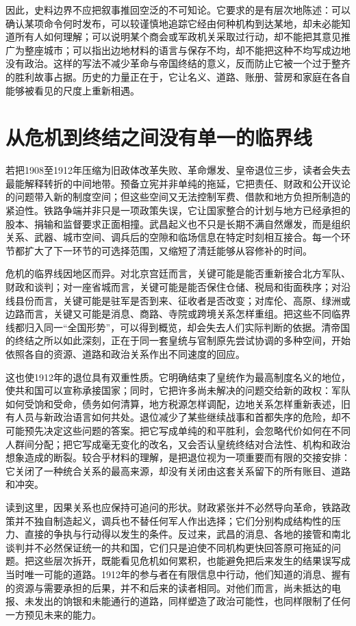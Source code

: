 因此，史料边界不应把叙事推回空泛的不可知论。它要求的是有层次地陈述：可以确认某项命令何时发布，可以较谨慎地追踪它经由何种机构到达某地，却未必能知道所有人如何理解；可以说明某个商会或军政机关采取过行动，却不能把其意见推广为整座城市；可以指出边地材料的语言与保存不均，却不能把这种不均写成边地没有政治。这样的写法不减少革命与帝国终结的意义，反而防止它被一个过于整齐的胜利故事占据。历史的力量正在于，它让名义、道路、账册、营房和家庭在各自能够被看见的尺度上重新相遇。

\section{从危机到终结之间没有单一的临界线}

若把1908至1912年压缩为旧政体改革失败、革命爆发、皇帝退位三步，读者会失去最能解释转折的中间地带。预备立宪并非单纯的拖延，它把责任、财政和公开议论的问题带入新的制度空间；但这些空间又无法控制军费、借款和地方负担所制造的紧迫性。铁路争端并非只是一项政策失误，它让国家整合的计划与地方已经承担的股本、捐输和监督要求正面相撞。武昌起义也不只是长期不满自然爆发，而是组织关系、武器、城市空间、调兵后的空隙和临场信息在特定时刻相互接合。每一个环节都扩大了下一环节的可选择范围，又缩短了清廷能够从容修补的时间。

危机的临界线因地区而异。对北京宫廷而言，关键可能是能否重新接合北方军队、财政和谈判；对一座省城而言，关键可能是能否保住仓储、税局和街面秩序；对沿线县份而言，关键可能是驻军是否到来、征收者是否改变；对库伦、高原、绿洲或边路而言，关键又可能是消息、商路、寺院或跨境关系怎样重组。把这些不同临界线都归入同一“全国形势”，可以得到概览，却会失去人们实际判断的依据。清帝国的终结之所以如此深刻，正在于同一套皇统与官制原先尝试协调的多种空间，开始依照各自的资源、道路和政治关系作出不同速度的回应。

这也使1912年的退位具有双重性质。它明确结束了皇统作为最高制度名义的地位，使共和国可以宣称承接国家；同时，它把许多尚未解决的问题交给新的政权：军队如何受饷和受命，债务如何清算，地方税源怎样调配，边地关系怎样重新表述，旧有人员与新政治语言如何共处。退位减少了某些继续战事和首都失序的危险，却不可能预先决定这些问题的答案。把它写成单纯的和平胜利，会忽略代价如何在不同人群间分配；把它写成毫无变化的改名，又会否认皇统终结对合法性、机构和政治想象造成的断裂。较合乎材料的理解，是把退位视为一项重要而有限的交接安排：它关闭了一种统合关系的最高来源，却没有关闭由这套关系留下的所有账目、道路和冲突。

读到这里，因果关系也应保持可追问的形状。财政紧张并不必然导向革命，铁路政策并不独自制造起义，调兵也不替任何军人作出选择；它们分别构成结构性的压力、直接的争执与行动得以发生的条件。反过来，武昌的消息、各地的接管和南北谈判并不必然保证统一的共和国，它们只是迫使不同机构更快回答原可拖延的问题。把这些层次拆开，既能看见危机如何累积，也能避免把后来发生的结果误写成当时唯一可能的道路。1912年的参与者在有限信息中行动，他们知道的消息、握有的资源与需要承担的后果，并不和后来的读者相同。对他们而言，尚未抵达的电报、未发出的饷银和未能通行的道路，同样塑造了政治可能性，也同样限制了任何一方预见未来的能力。

